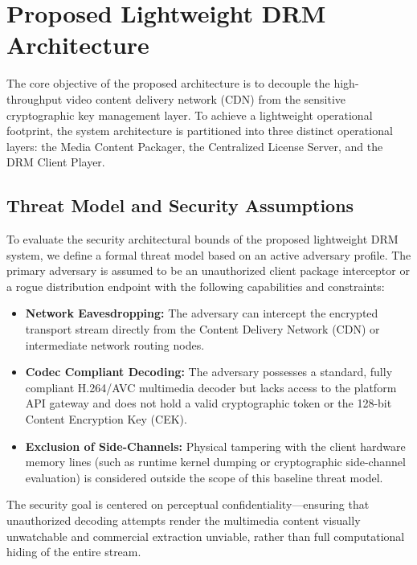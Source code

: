 \section{Proposed Lightweight DRM Architecture}
The core objective of the proposed architecture is to decouple the high-throughput video content delivery network (CDN) from the sensitive cryptographic key management layer. To achieve a lightweight operational footprint, the system architecture is partitioned into three distinct operational layers: the Media Content Packager, the Centralized License Server, and the DRM Client Player.

\subsection{Threat Model and Security Assumptions}
To evaluate the security architectural bounds of the proposed lightweight DRM system, we define a formal threat model based on an active adversary profile. The primary adversary is assumed to be an unauthorized client package interceptor or a rogue distribution endpoint with the following capabilities and constraints:
\begin{itemize}
    \item \textbf{Network Eavesdropping:} The adversary can intercept the encrypted transport stream directly from the Content Delivery Network (CDN) or intermediate network routing nodes.
    \item \textbf{Codec Compliant Decoding:} The adversary possesses a standard, fully compliant H.264/AVC multimedia decoder but lacks access to the platform API gateway and does not hold a valid cryptographic token or the 128-bit Content Encryption Key (CEK).
    \item \textbf{Exclusion of Side-Channels:} Physical tampering with the client hardware memory lines (such as runtime kernel dumping or cryptographic side-channel evaluation) is considered outside the scope of this baseline threat model.
\end{itemize}
The security goal is centered on perceptual confidentiality—ensuring that unauthorized decoding attempts render the multimedia content visually unwatchable and commercial extraction unviable, rather than full computational hiding of the entire stream.

